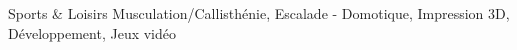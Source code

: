

\begin{cvskills}

  \cvskill
    {Sports \& Loisirs} %
    {Musculation/Callisthénie, Escalade - Domotique, Impression 3D, Développement, Jeux vidéo} %

\end{cvskills}
